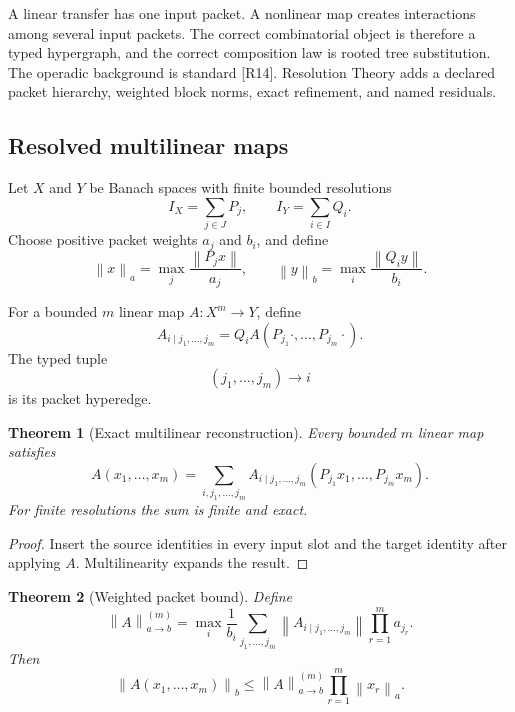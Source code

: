 \documentclass{aomart}
\newtheorem{theorem}{Theorem}[section]
\theoremstyle{definition}
\theoremstyle{remark}
\newcommand{\norm}[1]{\left\lVert#1\right\rVert}
\newcommand{\Rcite}[1]{\textup{[#1]}}
\begin{document}
A linear transfer has one input packet. A nonlinear map creates interactions among several input packets. The correct combinatorial object is therefore a typed hypergraph, and the correct composition law is rooted tree substitution. The operadic background is standard \Rcite{R14}. Resolution Theory adds a declared packet hierarchy, weighted block norms, exact refinement, and named residuals.

\subsection{Resolved multilinear maps}

Let \(X\) and \(Y\) be Banach spaces with finite bounded resolutions
\[
 I_X=\sum_{j\in J}P_j,
 \qquad
 I_Y=\sum_{i\in I}Q_i.
\]
Choose positive packet weights \(a_j\) and \(b_i\), and define
\[
 \norm{x}_a
 =
 \max_j\frac{\norm{P_jx}}{a_j},
 \qquad
 \norm{y}_b
 =
 \max_i\frac{\norm{Q_iy}}{b_i}.
\]

\begin{definition}\label{def:resolved_multilinear}
For a bounded \(m\) linear map \(A:X^m\to Y\), define
\[
 A_{i\mid j_1,\ldots,j_m}
 =
 Q_iA(P_{j_1}\cdot,\ldots,P_{j_m}\cdot).
\]
The typed tuple
\[
 (j_1,\ldots,j_m)\longrightarrow i
\]
is its packet hyperedge.
\end{definition}

\begin{theorem}[Exact multilinear reconstruction]\label{thm:multilinear_reconstruction}
Every bounded \(m\) linear map satisfies
\[
 \boxed{
 A(x_1,\ldots,x_m)
 =
 \sum_{i,j_1,\ldots,j_m}
 A_{i\mid j_1,\ldots,j_m}
 (P_{j_1}x_1,\ldots,P_{j_m}x_m).
 }
\]
For finite resolutions the sum is finite and exact.
\end{theorem}

\begin{proof}
Insert the source identities in every input slot and the target identity after applying \(A\). Multilinearity expands the result.
\end{proof}

\begin{theorem}[Weighted packet bound]\label{thm:weighted_packet_bound}
Define
\[
 \norm{A}^{(m)}_{a\to b}
 =
 \max_i\frac1{b_i}
 \sum_{j_1,\ldots,j_m}
 \norm{A_{i\mid j_1,\ldots,j_m}}
 \prod_{r=1}^{m}a_{j_r}.
\]
Then
\[
 \boxed{
 \norm{A(x_1,\ldots,x_m)}_b
 \le
 \norm{A}^{(m)}_{a\to b}
 \prod_{r=1}^{m}\norm{x_r}_a.
 }
\]
\end{theorem}
\end{document}
